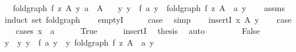 \begin{isabellebody}
\ \ \ {\isachardoublequoteopen}fold{\isacharunderscore}{\kern0pt}graph\ f\ z\ A\ y{\isachardoublequoteclose}\ {\isachardoublequoteopen}a\ {\isasymin}\ A{\isachardoublequoteclose}\isanewline
\ \ \ {\isachardoublequoteopen}{\isasymexists}y{\isacharprime}{\kern0pt}{\isachardot}{\kern0pt}\ y\ {\isacharequal}{\kern0pt}\ f\ a\ y{\isacharprime}{\kern0pt}\ {\isasymand}\ fold{\isacharunderscore}{\kern0pt}graph\ f\ z\ {\isacharparenleft}{\kern0pt}A\ {\isacharminus}{\kern0pt}\ {\isacharbraceleft}{\kern0pt}a{\isacharbraceright}{\kern0pt}{\isacharparenright}{\kern0pt}\ y{\isacharprime}{\kern0pt}{\isachardoublequoteclose}\isanewline
%
\isadelimproof
\ \ %
\endisadelimproof
%
\isatagproof
{}\isamarkupfalse%
\ assms{\isacharparenleft}{\kern0pt}{}{\isacharminus}{\kern0pt}{\isacharcomma}{\kern0pt}{}{\isacharparenright}{\kern0pt}\isanewline
{}\isamarkupfalse%
\ {\isacharparenleft}{\kern0pt}induct\ set{\isacharcolon}{\kern0pt}\ fold{\isacharunderscore}{\kern0pt}graph{\isacharparenright}{\kern0pt}\isanewline
\ \ \isamarkupfalse%
\ emptyI\isanewline
\ \ \isamarkupfalse%
\ \isamarkupfalse%
\ {\isacharquery}{\kern0pt}case\ \isamarkupfalse%
\ simp\isanewline
{}\isamarkupfalse%
\isanewline
\ \ \isamarkupfalse%
\ {\isacharparenleft}{\kern0pt}insertI\ x\ A\ y{\isacharparenright}{\kern0pt}\isanewline
\ \ \isamarkupfalse%
\ {\isacharquery}{\kern0pt}case\isanewline
\ \ \isamarkupfalse%
\ {\isacharparenleft}{\kern0pt}cases\ {\isachardoublequoteopen}x\ {\isacharequal}{\kern0pt}\ a{\isachardoublequoteclose}{\isacharparenright}{\kern0pt}\isanewline
\ \ \ \ \isamarkupfalse%
\ True\isanewline
\ \ \ \ \isamarkupfalse%
\ insertI\ \isamarkupfalse%
\ {\isacharquery}{\kern0pt}thesis\ \isamarkupfalse%
\ auto\isanewline
\ \ \isamarkupfalse%
\isanewline
\ \ \ \ \isamarkupfalse%
\ False\isanewline
\ \ \ \ \isamarkupfalse%
\ \isamarkupfalse%
\ y{\isacharprime}{\kern0pt}\ \ y{\isacharcolon}{\kern0pt}\ {\isachardoublequoteopen}y\ {\isacharequal}{\kern0pt}\ f\ a\ y{\isacharprime}{\kern0pt}{\isachardoublequoteclose}\ \ y{\isacharprime}{\kern0pt}{\isacharcolon}{\kern0pt}\ {\isachardoublequoteopen}fold{\isacharunderscore}{\kern0pt}graph\ f\ z\ {\isacharparenleft}{\kern0pt}A\ {\isacharminus}{\kern0pt}\ {\isacharbraceleft}{\kern0pt}a{\isacharbraceright}{\kern0pt}{\isacharparenright}{\kern0pt}\ y{\isacharprime}{\kern0pt}{\isachardoublequoteclose}\isanewline

\end{isabellebody}
